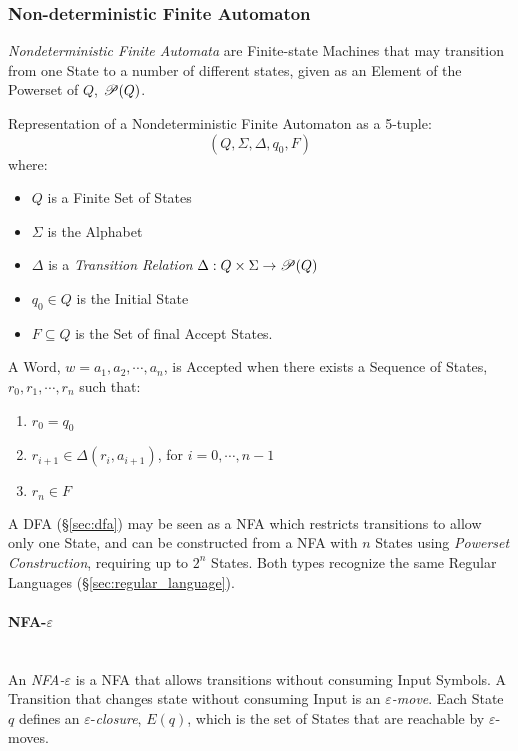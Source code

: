 \subsubsection{Non-deterministic Finite Automaton}\label{sec:ndfa}

\emph{Nondeterministic Finite Automata} are Finite-state Machines that
may transition from one State to a number of different states, given
as an Element of the Powerset of $Q$, $\mathscr{P}(Q)$.

Representation of a Nondeterministic Finite Automaton as a
5-tuple:
\[
  (Q,\Sigma,\Delta,q_0,F)
\]
where:
\begin{itemize}
  \item $Q$ is a Finite Set of States
  \item $\Sigma$ is the Alphabet
  \item $\Delta$ is a \emph{Transition Relation} $\Delta: Q \times
    \Sigma \rightarrow \mathscr{P}(Q)$
  \item $q_0 \in Q$ is the Initial State
  \item $F \subseteq Q$ is the Set of final Accept States.
\end{itemize}

A Word, $w=a_1,a_2,\cdots,a_n$, is Accepted when there exists a
Sequence of States, $r_0,r_1,\cdots,r_n$ such that:
\begin{enumerate}
  \item $r_0 = q_0$
  \item $r_{i+1} \in \Delta(r_i, a_{i+1})$, for $i = 0, \cdots, n-1$
  \item $r_n \in F$
\end{enumerate}

A DFA (\S\ref{sec:dfa}) may be seen as a NFA which restricts
transitions to allow only one State, and can be constructed from a NFA
with $n$ States using \emph{Powerset Construction}, requiring up to
$2^n$ States. Both types recognize the same Regular Languages
(\S\ref{sec:regular_language}).



\paragraph{NFA-$\varepsilon$}\label{sec:nfa_e}\hfill \\
An \emph{NFA-$\varepsilon$} is a NFA that allows transitions without
consuming Input Symbols. A Transition that changes state without
consuming Input is an \emph{$\varepsilon$-move}. Each State $q$
defines an $\varepsilon$-\emph{closure}, $E(q)$, which is the set of
States that are reachable by $\varepsilon$-moves.

